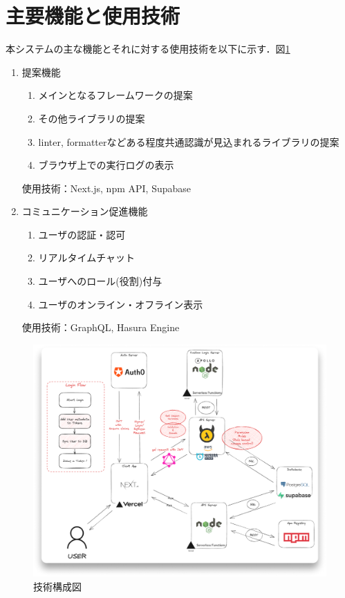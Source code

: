 \documentclass[main]{subfiles}
\begin{document}
\section{主要機能と使用技術}
本システムの主な機能とそれに対する使用技術を以下に示す．図\ref{fig:techstack}

\begin{enumerate}
\item 提案機能
\begin{enumerate}
\item メインとなるフレームワークの提案
\item その他ライブラリの提案
\item linter, formatterなどある程度共通認識が見込まれるライブラリの提案
\item ブラウザ上での実行ログの表示
\end{enumerate}
使用技術：Next.js, npm API, Supabase

\item コミュニケーション促進機能
\begin{enumerate}
\item ユーザの認証・認可
\item リアルタイムチャット
\item ユーザへのロール(役割)付与
\item ユーザのオンライン・オフライン表示
\end{enumerate}
使用技術：GraphQL, Hasura Engine
\end{enumerate}

\begin{figure}[h]
    \centering
    \includegraphics[keepaspectratio,width=0.9\linewidth]{../figures/techstack.png}
    \caption{技術構成図}
    \label{fig:techstack}
\end{figure}
\end{document}
